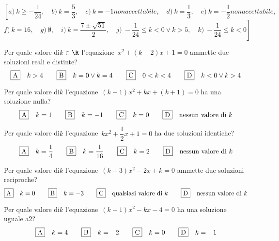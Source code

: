 \begin{flushright}
\(\left[a)~ k \geq-\dfrac{1}{24} ,\quad b)~ k = \dfrac{5}{3} ,\quad 
c)~ k=-1  non accettabile,\quad d)~ k = \dfrac{1}{3} ,\quad e)~ k 
=-\dfrac{1}{2} non accettabile,\quad \right.\)
\(\left.f)~ k = 16 ,\quad g)~ \emptyset ,\quad 
i)~ k = \dfrac{7 \pm \sqrt{51}}{2} ,\quad j)~ - \dfrac{1}{24} \leq k < 0 
\vee k 
> 5 ,\quad k)~ - \dfrac{1}{24} \leq k < 0 \right]\)
\end{flushright}

\begin{esercizio}
 \label{ese:3.106}
Per quale valore di\(k \in \R\) l'equazione~\(x^{2} + (k-2) x + 1 = 0\) 
ammette 
due soluzioni reali e distinte?
\[\fbox{A}\quad k > 4\qquad\fbox{B}\quad k = 0 \vee k = 
4\qquad\fbox{C}\quad 0 < k < 4\qquad\fbox{D}\quad k < 0 \vee k > 4\]
\end{esercizio}

\begin{esercizio}
 \label{ese:3.107}
Per quale valore di\(k\) l'equazione~\((k-1) x^{2} + kx + (k + 1) = 0\) ha 
una soluzione nulla?
\[\fbox{A}\quad k = 1\qquad\fbox{B}\quad k = -1\qquad\fbox{C}\quad k 
=0\qquad\fbox{D}\quad \text{nessun valore di }k\]
\end{esercizio}

\begin{esercizio}
 \label{ese:3.108}
Per quale valore di\(k\) l'equazione~\(kx^{2} + \dfrac{1}{2} x + 1 = 0\) ha 
due 
soluzioni identiche?
\[\fbox{A}\quad k = \dfrac{1}{4}\qquad\fbox{B}\quad k = 
\dfrac{1}{16}\qquad\fbox{C}\quad k 
= 2\qquad\fbox{D}\quad \text{nessun valore di }k\]
\end{esercizio}

\begin{esercizio}
 \label{ese:3.109}
Per quale valore di\(k\) l'equazione~\((k + 3) x^{2}-2x + k = 0\) ammette 
due 
soluzioni reciproche?
\[\fbox{A}\quad k = 0\qquad\fbox{B}\quad k = -3\qquad\fbox{C}\quad 
\text{qualsiasi 
valore 
di }k\qquad\fbox{D}\quad \text{nessun valore di }k\]
\end{esercizio}

\begin{esercizio}
 \label{ese:3.110}
Per quale valore di\(k\) l'equazione~\((k + 1) x^{2}-kx-4 = 0\) ha una 
soluzione 
uguale a\(2\)?
\[\fbox{A}\quad k = 4\qquad\fbox{B}\quad k =-2\qquad\fbox{C}\quad k = 
0\qquad\fbox{D}\quad k 
=-1\]
\end{esercizio}


